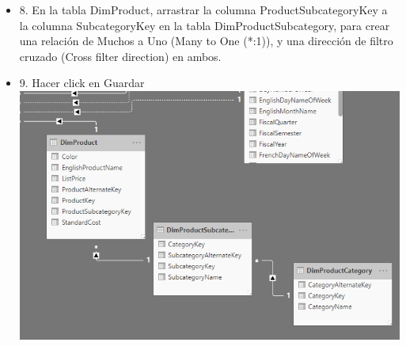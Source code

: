 \begin{itemize}
\item 8. En la tabla DimProduct, arrastrar la columna ProductSubcategoryKey a la columna SubcategoryKey en la tabla DimProductSubcategory, para crear una relación de Muchos a Uno (Many to One (*:1)), y una dirección de filtro cruzado (Cross filter direction) en ambos.
\item9. Hacer click en Guardar \\
\includegraphics[scale=0.5]{./Imagenes/image014}


\end{itemize}